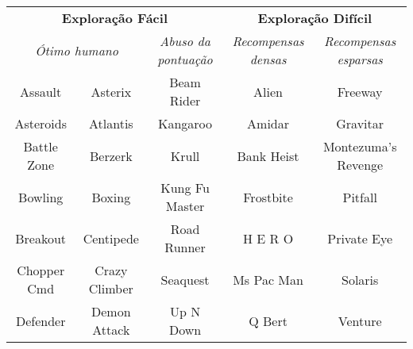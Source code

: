 \begin{tabular}{cc|c||c|c}
    \multicolumn{3}{c||}{\textbf{Exploração Fácil}}         & \multicolumn{2}{c}{\textbf{Exploração Difícil}}                                             \\
    \multicolumn{2}{c|}{\emph{Ótimo humano}}        & \emph{Abuso da pontuação}                 & \emph{Recompensas densas} & \emph{Recompensas esparsas} \\
    \hline
    Assault     & Asterix                    & Beam Rider                & Alien                     & Freeway                                            \\
    Asteroids   & Atlantis                   & Kangaroo                  & Amidar                    & Gravitar                                           \\
    Battle Zone & Berzerk                    & Krull                     & Bank Heist                & Montezuma's Revenge                                \\
    Bowling     & Boxing                     & Kung Fu Master            & Frostbite                 & Pitfall                                            \\
    Breakout    & Centipede                  & Road Runner               & H E R O                   & Private Eye                                        \\
    Chopper Cmd & Crazy Climber              & Seaquest                  & Ms Pac Man                & Solaris                                            \\
    Defender    & Demon Attack               & Up N Down                 & Q Bert                    & Venture                                            \\
    \hline
\end{tabular}
